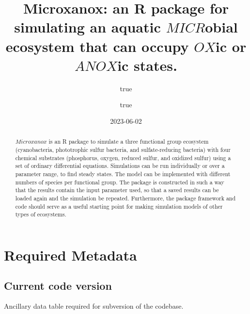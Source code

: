 \documentclass[
]{article}
\title{Microxanox: an R package for simulating an aquatic \(MICR\)obial
ecosystem that can occupy \(OX\)ic or \(ANOX\)ic states.}
\author{true \and true}
\date{2023-06-02}
\begin{document}
\maketitle
\begin{abstract}
\(Microxanox\) is an R package to simulate a three functional group
ecosystem (cyanobacteria, phototrophic sulfur bacteria, and
sulfate-reducing bacteria) with four chemical substrates (phosphorus,
oxygen, reduced sulfur, and oxidized sulfur) using a set of ordinary
differential equations. Simulations can be run individually or over a
parameter range, to find steady states. The model can be implemented
with different numbers of species per functional group. The package is
constructed in such a way that the results contain the input parameter
used, so that a saved results can be loaded again and the simulation be
repeated. Furthermore, the package framework and code should serve as a
useful starting point for making simulation models of other types of
ecosystems.
\end{abstract}

\pagebreak

\hypertarget{required-metadata}{%
\section{Required Metadata}\label{required-metadata}}

\hypertarget{current-code-version}{%
\subsection{Current code version}\label{current-code-version}}

Ancillary data table required for subversion of the codebase.
\end{document}
